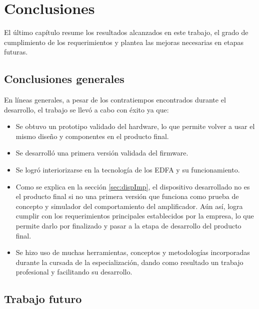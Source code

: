 
\chapter{Conclusiones} %

\label{Chapter5} %



El último capítulo resume los resultados alcanzados en este trabajo, el grado de cumplimiento de los requerimientos y plantea las mejoras necesarias en etapas futuras.

\section{Conclusiones generales}

En líneas generales, a pesar de los contratiempos encontrados durante el desarrollo, el trabajo se llevó a cabo con éxito ya que:  

\begin{itemize}
\item Se obtuvo un prototipo validado del hardware, lo que permite volver a usar el mismo diseño y componentes en el producto final.
\item Se desarrolló una primera versión validada del firmware.
\item Se logró interiorizarse en la tecnología de los EDFA y su funcionamiento.
\item Como se explica en la sección \ref{sec:dispImp}, el dispositivo desarrollado no es el producto final si no una primera versión que funciona como prueba de concepto y simulador del comportamiento del amplificador. Aún así, logra cumplir con los requerimientos principales establecidos por la empresa, lo que permite darlo por finalizado y pasar a la etapa de desarrollo del producto final.
\item Se hizo uso de muchas herramientas, conceptos y metodologías incorporadas durante la cursada de la especialización, dando como resultado un trabajo profesional y facilitando su desarrollo.
\end{itemize}

\section{Trabajo futuro}

